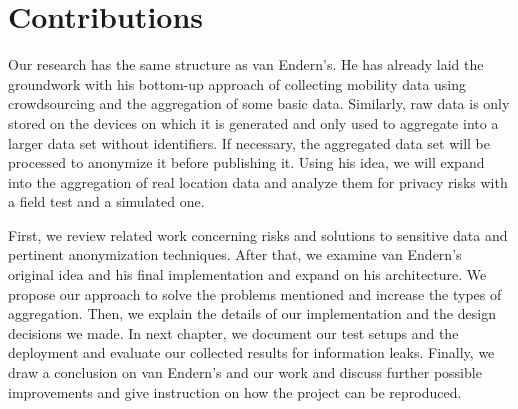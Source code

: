 \section{Contributions}
Our research has the same structure as van Endern's. He has already laid the groundwork with his bottom-up approach of collecting mobility data using crowdsourcing and the aggregation of some basic data. Similarly, raw data is only stored on the devices on which it is generated and only used to aggregate into a larger data set without identifiers. If necessary, the aggregated data set will be processed to anonymize it before publishing it. Using his idea, we will expand into the aggregation of real location data and analyze them for privacy risks with a field test and a simulated one.

First, we review related work concerning risks and solutions to sensitive data and pertinent anonymization techniques. After that, we examine van Endern's original idea and his final implementation and expand on his architecture. We propose our approach to solve the  problems mentioned and increase the types of aggregation. Then, we explain the details of our implementation and the design decisions we made. In next chapter, we document our test setups and the deployment and evaluate our collected results for information leaks. Finally, we draw a conclusion on van Endern's and our work and discuss further possible improvements and give instruction on how the project can be reproduced.
